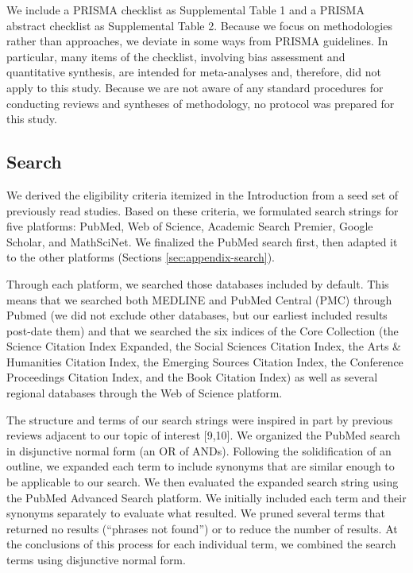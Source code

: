 \documentclass[preprint, 3p,
authoryear]{elsarticle} %
\begin{document}
We include a PRISMA checklist as Supplemental Table 1 and a PRISMA
abstract checklist as Supplemental Table 2. Because we focus on
methodologies rather than approaches, we deviate in some ways from
PRISMA guidelines. In particular, many items of the checklist, involving
bias assessment and quantitative synthesis, are intended for
meta-analyses and, therefore, did not apply to this study. Because we
are not aware of any standard procedures for conducting reviews and
syntheses of methodology, no protocol was prepared for this study.

\hypertarget{search}{%
\subsection{Search}\label{search}}

We derived the eligibility criteria itemized in the Introduction from a
seed set of previously read studies. Based on these criteria, we
formulated search strings for five platforms: PubMed, Web of Science,
Academic Search Premier, Google Scholar, and MathSciNet. We finalized
the PubMed search first, then adapted it to the other platforms
(Sections \ref{sec:appendix-search}).

Through each platform, we searched those databases included by default.
This means that we searched both MEDLINE and PubMed Central (PMC)
through Pubmed (we did not exclude other databases, but our earliest
included results post-date them) and that we searched the six indices of
the Core Collection (the Science Citation Index Expanded, the Social
Sciences Citation Index, the Arts \& Humanities Citation Index, the
Emerging Sources Citation Index, the Conference Proceedings Citation
Index, and the Book Citation Index) as well as several regional
databases through the Web of Science platform.

The structure and terms of our search strings were inspired in part by
previous reviews adjacent to our topic of interest {[}9,10{]}. We
organized the PubMed search in disjunctive normal form (an OR of ANDs).
Following the solidification of an outline, we expanded each term to
include synonyms that are similar enough to be applicable to our search.
We then evaluated the expanded search string using the PubMed Advanced
Search platform. We initially included each term and their synonyms
separately to evaluate what resulted. We pruned several terms that
returned no results (``phrases not found'') or to reduce the number of
results. At the conclusions of this process for each individual term, we
combined the search terms using disjunctive normal form.
\end{document}
